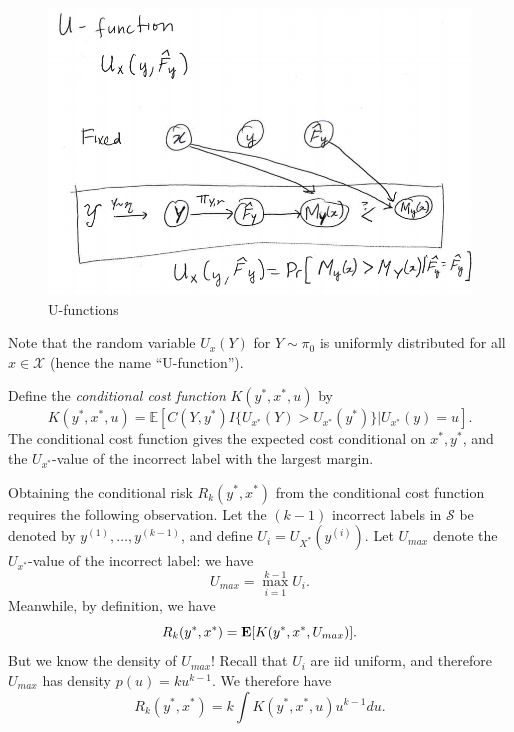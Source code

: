 \documentclass[12pt]{article}
\begin{document}
\begin{figure}[h]
\centering
\includegraphics[scale = 0.4]{extrapolation_figures/U_function.png}
\caption{U-functions}\label{fig:U_function}
\end{figure}

Note that the random variable $U_x(Y)$ for $Y \sim \pi_0$ is uniformly
distributed for all $x \in \mathcal{X}$ (hence the name ``U-function'').

Define the \emph{conditional cost function} $K(y^*, x^*, u)$ by
\begin{equation}\label{eq:Kfunc}
K(y^*, x^*, u) = \mathbb{E}[C(Y, y^*)I\{U_{x^*}(Y) > U_{x^*}(y^*)\}|U_{x^*}(y) = u].
\end{equation}
The conditional cost function gives the expected cost conditional on
$x^*, y^*$, and the $U_{x^*}$-value of the incorrect label with the
largest margin.

Obtaining the conditional risk $R_k(y^*, x^*)$ from the conditional
cost function requires the following observation.  Let the $(k-1)$
incorrect labels in $\mathcal{S}$ be denoted by $y^{(1)},\hdots,
y^{(k-1)}$, and define $U_i = U_{X^*}(y^{(i)})$. Let $U_{max}$ denote the $U_{x^*}$-value of
the incorrect label: we have
\[
U_{max} = \max_{i=1}^{k-1} U_i.
\]
Meanwhile, by definition, we have
\[
R_k(y^*, x^*) = \textbf{E}[K(y^*, x^*, U_{max})].
\]
But we know the density of $U_{max}$!  Recall that $U_i$ are iid
uniform, and therefore $U_{max}$ has density $p(u) = ku^{k-1}$.  We
therefore have
\[
R_k(y^*, x^*) = k \int K(y^*, x^*, u) u^{k-1} du.
\]
\end{document}
